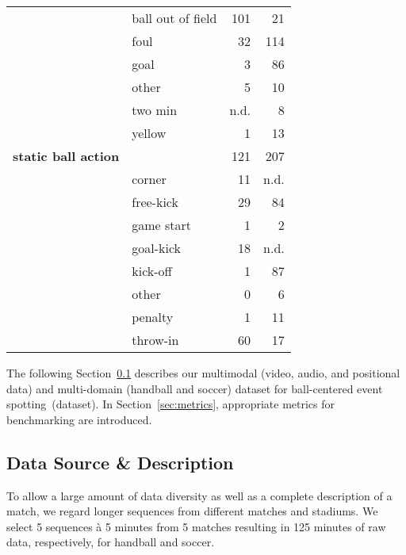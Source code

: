 \begin{table}[b]
\begin{tabularx}{\linewidth}{Xlrr}
                           & ball out of field &           101 &              21 \\
                           & foul &            32 &             114 \\
                           & goal &             3 &              86 \\
                           & other &             5 &              10 \\
                           & two min &             n.d. &               8 \\
                           & yellow &             1 &              13 \\ \hline
\textbf{static ball action}         &         &            121 &               207 \\ \hline
                           & corner &            11 &               n.d. \\
                           & free-kick &            29 &              84 \\
                           & game start &             1 &               2 \\
                           & goal-kick &            18 &               n.d. \\
                           & kick-off &             1 &              87 \\
                           & other &             0 &               6 \\
                           & penalty &             1 &              11 \\
                           & throw-in &            60 &              17 \\
\bottomrule
\end{tabularx}

   

\end{table}
The following Section~\ref{sec:dataset_description} describes our multimodal (video, audio, and positional data) and multi-domain (handball and soccer) dataset for ball-centered event spotting~(\acrshort{dataset}). 
In Section~\ref{sec:metrics}, appropriate metrics for benchmarking are introduced.

\subsection{Data Source \& Description}\label{sec:dataset_description}
To allow a large amount of data diversity as well as a complete description of a match, we regard longer sequences from different matches and stadiums. 
We select 5 sequences à 5 minutes from 5 matches resulting in 125 minutes of raw data, respectively, for handball and soccer.

